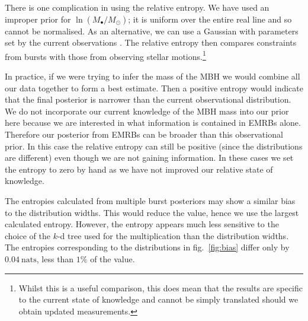 \documentclass[useAMS,usedcolumn,usegraphicx,usenatbib]{mn2e}
\newcommand{\figref}[1]{fig.~\ref{fig:#1}}
\newcommand{\units}[1]{\ensuremath{~\mathrm{#1}}}
\begin{document}
There is one complication in using the relative entropy. We have used an improper prior for $\ln (M_\bullet/M_\odot)$; it is uniform over the entire real line and so cannot be normalised. As an alternative, we can use a Gaussian with parameters set by the current observations \citep{Gillessen2009}. The relative entropy then compares constraints from bursts with those from observing stellar motions.\footnote{Whilst this is a useful comparison, this does mean that the results are specific to the current state of knowledge and cannot be simply translated should we obtain updated measurements.}

In practice, if we were trying to infer the mass of the MBH we would combine all our data together to form a best estimate. Then a positive entropy would indicate that the final posterior is narrower than the current observational distribution. We do not incorporate our current knowledge of the MBH mass into our prior here because we are interested in what information is contained in EMRBs alone. Therefore our posterior from EMRBs can be broader than this observational prior. In this case the relative entropy can still be positive (since the distributions are different) even though we are not gaining information. In these cases we set the entropy to zero by hand as we have not improved our relative state of knowledge.

The entropies calculated from multiple burst posteriors may show a similar bias to the distribution widths. This would reduce the value, hence we use the largest calculated entropy. However, the entropy appears much less sensitive to the choice of the $k$-d tree used for the multiplication than the distribution widths. The entropies corresponding to the distributions in \figref{bias} differ only by $0.04\units{nats}$, less than $1\%$ of the value.
\end{document}
